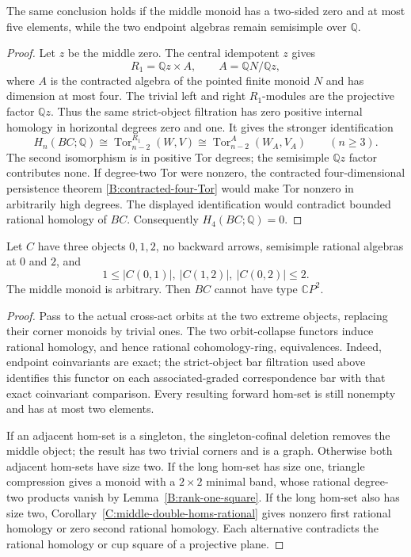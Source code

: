 \begin{corollary}
\label{C:semisimple-ends-small-zero-middle}
The same conclusion holds if the middle monoid has a two-sided
zero and at most five elements, while the two endpoint algebras
remain semisimple over $\mathbb Q$.
\end{corollary}
\begin{proof}
Let $z$ be the middle zero.  The central idempotent $z$ gives
\[
 R_1=\mathbb Qz\times A,\qquad
 A=\mathbb QN/\mathbb Qz,
\]
where $A$ is the contracted algebra of the pointed finite
monoid $N$ and has dimension at most four.  The trivial
left and right $R_1$-modules are the projective factor
$\mathbb Qz$.  Thus the same strict-object filtration has
zero positive internal homology in horizontal degrees
zero and one.  It gives the stronger identification
\[
 H_n(BC;\mathbb Q)
 \cong\operatorname{Tor}^{R_1}_{n-2}(W,V)
 \cong\operatorname{Tor}^{A}_{n-2}(W_A,V_A)
 \qquad(n\geq3).
\]
The second isomorphism is in positive Tor degrees; the
semisimple $\mathbb Qz$ factor contributes none.
If degree-two Tor were nonzero, the contracted
four-dimensional persistence theorem
\ref{B:contracted-four-Tor} would make Tor nonzero in
arbitrarily high degrees.  The displayed identification
would contradict bounded rational homology of $BC$.
Consequently $H_4(BC;\mathbb Q)=0$.
\end{proof}

\begin{corollary}
\label{C:semisimple-ends-binary-homs}
Let $C$ have three objects $0,1,2$, no backward arrows,
semisimple rational algebras at $0$ and $2$, and
\[
 1\leq|C(0,1)|,\ |C(1,2)|,\ |C(0,2)|\leq2.
\]
The middle monoid is arbitrary.  Then $BC$ cannot have type
$\mathbb CP^2$.
\end{corollary}
\begin{proof}
Pass to the actual cross-act orbits at the two extreme
objects, replacing their corner monoids by trivial ones.
The two orbit-collapse functors induce rational homology,
and hence rational cohomology-ring, equivalences.  Indeed,
endpoint coinvariants are exact; the strict-object bar
filtration used above identifies this functor on each
associated-graded correspondence bar with that exact
coinvariant comparison.  Every resulting forward hom-set
is still nonempty and has at most two elements.

If an adjacent hom-set is a singleton, the singleton-cofinal
deletion removes the middle object; the result has two
trivial corners and is a graph.  Otherwise both adjacent
hom-sets have size two.  If the long hom-set has size one,
triangle compression gives a monoid with a $2\times2$
minimal band, whose rational degree-two products vanish
by Lemma~\ref{B:rank-one-square}.  If the long hom-set
also has size two, Corollary~\ref{C:middle-double-homs-rational}
gives nonzero first rational homology or zero second
rational homology.  Each alternative contradicts the
rational homology or cup square of a projective plane.
\end{proof}
